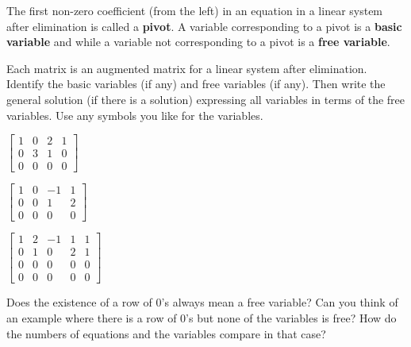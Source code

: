 \begin{definition} The first non-zero coefficient (from the left) in an equation in a linear system after elimination is called a \textbf{pivot}. A variable corresponding to a pivot is a \textbf{basic variable} and while a variable not corresponding to a pivot is a \textbf{free variable}.
\end{definition}

\begin{activity} \label{act:A1.2_4} Each matrix is an augmented matrix for a linear system after elimination. Identify the basic variables (if any) and free variables (if any). Then write the general solution (if there is a solution) expressing all variables in terms of the free variables. Use any symbols you like for the variables. 
	\ba
	\item $\left[ \begin{array}{ccc|c} 1&0&2&1 \\ 0&3&1&0 \\ 0&0&0&0 \end{array} \right]$



	\item $\left[ \begin{array}{ccr|c} 1&0&-1&1 \\ 0&0&1&2 \\ 0&0&0&0 \end{array} \right]$
	


	\item $\left[ \begin{array}{ccrc|c} 1&2&-1&1&1 \\ 0&1&0&2&1 \\ 0&0&0&0&0 \\ 0&0&0&0&0 \end{array} \right]$
	

	\ea

\end{activity}



\begin{reflect} Does the existence of a row of 0's always mean a free variable? Can you think of an example where there is a row of 0's but none of the variables is free? How do the numbers of equations and the variables compare in that case?
\end{reflect}




